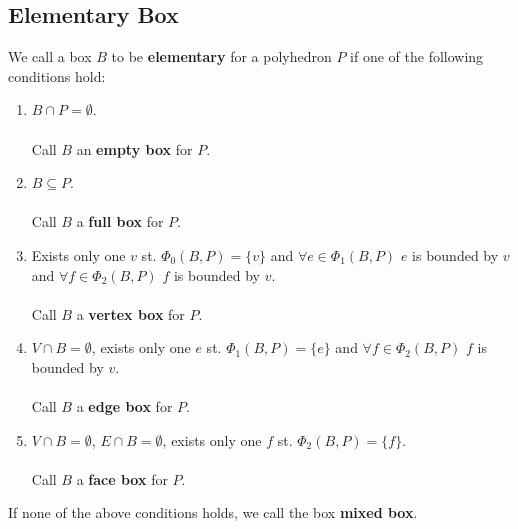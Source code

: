 \documentclass[twoside]{article}
\begin{document}
\begin{multicols}{2}
\subsection{Elementary Box}
	We call a box $B$ to be \textbf{elementary} for a polyhedron $P$ if one of the following conditions hold: 
		\begin{enumerate} 
           		\item $B\cap P=\emptyset$. 
           		\\
           		\\
           		Call $B$ an \textbf{empty box} for $P$.
           		\item $B \subseteq P$. 
           		\\
           		\\
           		Call $B$ a \textbf{full box} for $P$.
            	\item Exists only one $v$ st. $\Phi_0(B,P)=\{v\}$ and $\forall e \in \Phi_1(B,P)$ $e$ is bounded by $v$ and $\forall f \in \Phi_2(B,P)$ $f$ is bounded by $v$.
            	\\
            	\\
            	Call $B$ a \textbf{vertex box} for $P$.
            		\iffalse
           			 a box $B_e$ is a vertex box $\mathrm{iff}$  there exists only one vertex $v \in V \cap B_e$, s.t.\ $\forall e \in E$, if $e \cap B_e \not= \emptyset$, $v$ bounds $e$, and $\forall f \in F$, if $f \cap B_e \not= \emptyset$, $v$ bounds $F$. \\
			Because $|\Phi_0^*\ (B_e, P)|=1$, we can specify the only one vertex in the set as $v$
			We name the Edges bounded by $v$ as $(e_1,e_2,...)$. 
			We define $\bar{e_i}=e_i\cap B_s$.
			\fi
            		\item $V \cap B = \emptyset$, exists only one $e$ st. $\Phi_1(B,P)=\{e\}$ and $\forall f \in \Phi_2(B,P)$ $f$ is bounded by $v$.
            		\\
            		\\ 
            		Call $B$ a \textbf{edge box} for $P$. 
            		\iffalse
            			a box $B_e$ is an edge box $\mathrm{iff}$ $V \cap B_e = \emptyset$ and there exists only one edge $ e\in E$, $e\cap B_e \not= \emptyset, \forall f \in F$, if $f \cap B_e \not= \emptyset$, e bounds f. 
            		\fi
            		\item $V \cap B = \emptyset$, $E \cap B = \emptyset$, exists only one $f$ st. $\Phi_2(B,P)=\{f\}$.
            		\\
            		\\
            		Call $B$ a \textbf{face box} for $P$.
            		\iffalse
            			a box $B_e$ is a face box $\mathrm{iff}$ $V \cap B_e = \emptyset$, $E \cap B_e = \emptyset$ and there exists only one face $f \in F$, and $f \cap B_e \not= \emptyset$. 
            		\fi
                  \end{enumerate}
   \indent If none of the above conditions holds, we call the box \textbf{mixed box}.

\end{multicols}
\end{document}
